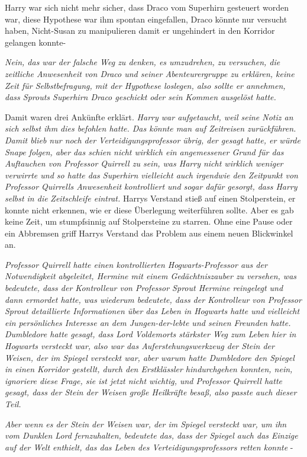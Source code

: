 Harry war sich nicht mehr sicher, dass Draco vom Superhirn gesteuert worden war,
diese Hypothese war ihm spontan eingefallen, Draco könnte nur versucht haben,
Nicht-Susan zu manipulieren damit er ungehindert in den Korridor gelangen
konnte-

\emph{Nein, das war der falsche Weg zu denken, es umzudrehen, zu versuchen, die
zeitliche Anwesenheit von Draco und seiner Abenteurergruppe zu erklären, keine
Zeit für Selbstbefragung, mit der Hypothese loslegen, also sollte er annehmen,
dass Sprouts Superhirn Draco geschickt oder sein Kommen ausgelöst hatte.}

Damit waren drei Ankünfte erklärt. \emph{ Harry war aufgetaucht, weil seine
Notiz an sich selbst ihm dies befohlen hatte. Das könnte man auf Zeitreisen
zurückführen. Damit blieb nur noch der Verteidigungsprofessor übrig, der gesagt
hatte, er würde Snape folgen, aber das schien nicht wirklich ein angemessener
Grund für das Auftauchen von Professor Quirrell zu sein, was Harry nicht
wirklich weniger verwirrte und so hatte das Superhirn vielleicht auch irgendwie
den Zeitpunkt von Professor Quirrells Anwesenheit kontrolliert und sogar dafür
gesorgt, dass Harry selbst in die} \emph{Zeitschleife eintrat.} Harrys Verstand
stieß auf einen Stolperstein, er konnte nicht erkennen, wie er diese Überlegung
weiterführen sollte. Aber es gab keine Zeit, um stumpfsinnig auf Stolpersteine
zu starren. Ohne eine Pause oder ein Abbremsen griff Harrys Verstand das Problem
aus einem neuen Blickwinkel an.

\emph{Professor Quirrell hatte einen kontrollierten Hogwarts-Professor aus der
Notwendigkeit abgeleitet, Hermine mit einem Gedächtniszauber zu versehen, was
bedeutete, dass der Kontrolleur von Professor Sprout Hermine reingelegt und dann
ermordet hatte, was wiederum bedeutete, dass der Kontrolleur von Professor
Sprout detaillierte Informationen über das Leben in Hogwarts hatte und
vielleicht ein persönliches Interesse an dem Jungen-der-lebte und seinen
Freunden hatte. Dumbledore hatte gesagt, dass Lord Voldemorts stärkster Weg zum
Leben hier in Hogwarts versteckt war, also war das Auferstehungswerkzeug der
Stein der Weisen, der im Spiegel versteckt war, aber warum hatte Dumbledore den
Spiegel in einen Korridor gestellt, durch den Erstklässler hindurchgehen
konnten, nein, ignoriere diese Frage, sie ist jetzt nicht wichtig, und Professor
Quirrell hatte gesagt, dass der Stein der Weisen große Heilkräfte besaß, also
passte auch dieser Teil.}

\emph{Aber wenn es der Stein der Weisen war, der im Spiegel versteckt war, um
ihn vom Dunklen Lord fernzuhalten, bedeutete das, dass der Spiegel auch das
Einzige auf der Welt enthielt, das das Leben des Verteidigungsprofessors retten
konnte} -


